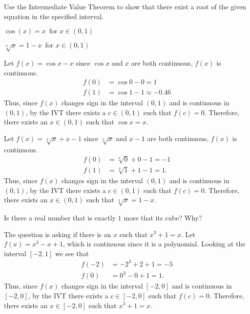 \documentclass{hwset}
\begin{document}
\begin{problem}[1.]
	Use the Intermediate Value Theorem to show that there exist a root of the
	given equation in the specified interval.
	\be
		\item $\cos(x)=x\, \text{ for } x\in (0,1)$
		\item $\sqrt[3]{x}=1-x\, \text{ for } x\in(0,1)$
	\ee
\end{problem}

\be
	\item
	\begin{solution}
		Let $f(x) = \cos x - x$ since $\cos x$ and $x$ are both continuous, $f(x)$ is
		continuous.
		\begin{align*}
			f(0) &= \cos 0 - 0 = 1 \\
			f(1) &= \cos 1 - 1 \approx -0.46
		\end{align*}
		Thus, since $f(x)$ changes sign in the interval $(0,1)$ and is continuous in
		$(0,1)$, by the IVT there exists a $c\in(0,1)$ such that $f(c)=0$.
		Therefore, there exists an $x\in(0,1)$ such that $\cos x = x$. 
	\end{solution}
	\item
	\begin{solution}
		Let $f(x) = \sqrt[3]{x} + x - 1$ since $\sqrt[3]{x}$ and $x - 1$ are both
		continuous, $f(x)$ is continuous.
		\begin{align*}
			f(0) &= \sqrt[3]{0} + 0 - 1 = -1 \\
			f(1) &= \sqrt[3]{1} + 1 -1 = 1.
		\end{align*}
		Thus, since $f(x)$ changes sign in the interval $(0,1)$ and is continuous in
		$(0,1)$, by the IVT there exists a $c\in(0,1)$ such that $f(c)=0$.
		Therefore, there exists an $x\in (0,1)$ such that $\sqrt[3]{x} = 1 - x$. 
	\end{solution}
\ee

\begin{problem}[2.]
	Is there a real number that is exactly $1$ more that its cube? Why?
\end{problem}

\begin{solution}
	The question is asking if there is an $x$ such that $x^3 + 1 = x$. Let $f(x) =
	x^3 - x + 1$, which is continuous since it is a polynomial. Looking at the
	interval $[-2,1]$ we see that 
	\begin{align*}
		f(-2) &= -2^3 + 2 + 1 = -5 \\
		f(0) &= 0^3 - 0 + 1 = 1.
	\end{align*}
		Thus, since $f(x)$ changes sign in the interval $[-2,0]$ and is continuous
		in $[-2,0]$, by the IVT there exists a $c\in[-2,0]$ such that $f(c)=0$.
		Therefore, there exists an $x\in[-2,0]$ such that $x^3 + 1 = x$. 
\end{solution}
\end{document}
